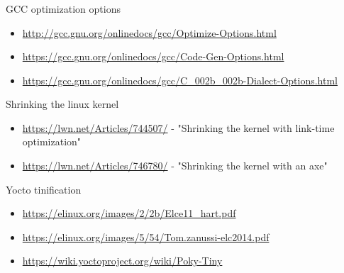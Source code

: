 \documentclass{beamer}
\begin{document}
\begin{frame}
\frametitle{\secname}
\tiny

GCC optimization options

\begin{itemize}
\item \url{http://gcc.gnu.org/onlinedocs/gcc/Optimize-Options.html}
\item \url{https://gcc.gnu.org/onlinedocs/gcc/Code-Gen-Options.html}
\item \url{https://gcc.gnu.org/onlinedocs/gcc/C_002b_002b-Dialect-Options.html}
\end{itemize}

Shrinking the linux kernel

\begin{itemize}
\item \url{https://lwn.net/Articles/744507/} - "Shrinking the kernel with link-time optimization"
\item \url{https://lwn.net/Articles/746780/} - "Shrinking the kernel with an axe"
\end{itemize}

Yocto tinification

\begin{itemize}
\item \url{https://elinux.org/images/2/2b/Elce11_hart.pdf}
\item \url{https://elinux.org/images/5/54/Tom.zanussi-elc2014.pdf}
\item \url{https://wiki.yoctoproject.org/wiki/Poky-Tiny}
\end{itemize}

\end{frame}
\end{document}
